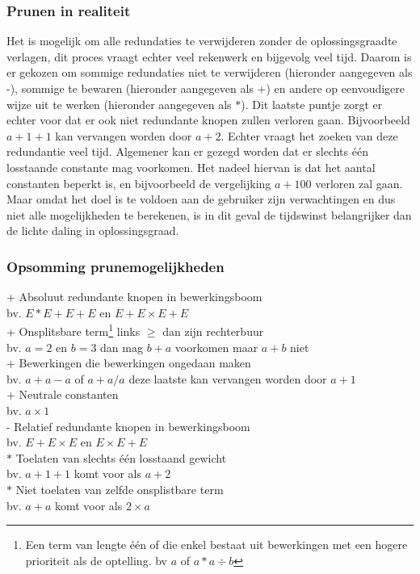 \documentclass[Main.tex]{subfiles}
\begin{document}
\subsubsection*{Prunen in realiteit}
Het is mogelijk om alle redundaties te verwijderen zonder de oplossingsgraad\footnotemark[\ref{note:oplossingsgraad}]
te verlagen, dit proces vraagt echter veel rekenwerk en bijgevolg veel tijd. Daarom is er gekozen om sommige redundaties niet te verwijderen (hieronder aangegeven als -), sommige te bewaren (hieronder aangegeven als +) en andere op eenvoudigere wijze uit te werken (hieronder aangegeven als $\ast$). Dit laatste puntje zorgt er echter voor dat er ook niet redundante knopen zullen verloren gaan. Bijvoorbeeld $a+1+1$ kan vervangen worden door $a+2$. Echter vraagt het zoeken van deze redundantie veel tijd. Algemener kan er gezegd worden dat er slechts één losstaande constante mag voorkomen. Het nadeel hiervan is dat het aantal constanten beperkt is, en bijvoorbeeld de vergelijking $a+100$ verloren zal gaan. Maar omdat het doel is te voldoen aan de gebruiker zijn verwachtingen en dus niet alle mogelijkheden te berekenen, is in dit geval de tijdswinst belangrijker dan de lichte daling in oplossingsgraad\footnotemark[\ref{note:oplossingsgraad}].
\subsubsection*{Opsomming prunemogelijkheden}
+ Absoluut redundante knopen in bewerkingsboom\\
	bv. $E \ast E+E+E$ en $E+E \times E+E$\\
+ Onsplitsbare term\footnote{\label{note:onsplitsbaar}Een term van lengte \'e\'en of die enkel bestaat uit bewerkingen met een hogere prioriteit als de optelling. bv $a$ of $a \ast a \div b$}
links $\geq$ dan zijn rechterbuur\\
	bv. $a=2$ en $b=3$ dan mag $b+a$ voorkomen maar $a+b$ niet\\
+ Bewerkingen die bewerkingen ongedaan maken\\
	bv. $a+a-a$ of $a+a/a$ deze laatste kan vervangen worden door $a+1$\\
+ Neutrale constanten\\
	bv. $a \times 1$\\
- Relatief redundante knopen in bewerkingsboom\\
	bv. $E+E \times E$ en $E \times E+E$\\
$\ast$ Toelaten van slechts één losstaand gewicht\\
	bv. $a+1+1$ komt voor als $a+2$\\
$\ast$ Niet toelaten van zelfde onsplistbare term\footnotemark[\ref{note:onsplitsbaar}]\\
	bv. $a+a$ komt voor als $2 \times a$
\end{document}
